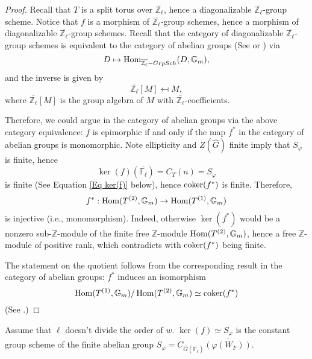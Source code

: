 \begin{proof}
	Recall that $T$ is a split torus over $\overline{\mathbb{Z}_{\ell}}$, hence a diagonalizable $\overline{\mathbb{Z}_{\ell}}$-group scheme. Notice that $f$ is a morphism of $\overline{\mathbb{Z}_{\ell}}$-group schemes, hence a morphism of diagonalizable $\overline{\mathbb{Z}_{\ell}}$-group schemes. Recall that the category of diagonalizable $\overline{\mathbb{Z}_{\ell}}$-group schemes is equivalent to the category of abelian groups (See \cite[p70, Section 5]{brochard2014autour} or \cite{conrad2014reductive}) via
	$$D \mapsto \operatorname{\operatorname{Hom}}_{\overline{\mathbb{Z}_{\ell}}-GrpSch}(D, \mathbb{G}_m),$$
	and the inverse is given by 
	$$\overline{\mathbb{Z}_{\ell}}[M] \mapsfrom M,$$
	where $\overline{\mathbb{Z}_{\ell}}[M]$ is the group algebra of $M$ with $\overline{\mathbb{Z}_{\ell}}$-coefficients.
	
	Therefore, we could argue in the category of abelian groups via the above category equivalence: $f$ is epimorphic if and only if the map $f^*$ in the category of abelian groups is monomorphic. Note ellipticity and $Z(\hat{G})$ finite imply that $S_{\varphi}$ is finite, hence 
	$$\ker(f)(\overline{\mathbb{F}_{\ell}})=C_T(n)=S_{\varphi}$$
	is finite (See Equation \eqref{Eq ker(f)} below), hence $\operatorname{coker}(f^*)$ is finite. Therefore, 
	$$f^*:\operatorname{\operatorname{Hom}}(T^{(2)}, \mathbb{G}_m) \to \operatorname{\operatorname{Hom}}(T^{(1)}, \mathbb{G}_m)$$
	is injective (i.e., monomorphism). Indeed, otherwise $\ker(f^*)$ would be a nonzero sub-$\mathbb{Z}$-module of the finite free $\mathbb{Z}$-module $\operatorname{\operatorname{Hom}}(T^{(2)}, \mathbb{G}_m)$, hence a free $\mathbb{Z}$-module of positive rank, which contradicts with $\operatorname{coker}(f^*)$ being finite.
	
	The statement on the quotient follows from the corresponding result in the category of abelian groups: $f^*$ induces an isomorphism
	$$\operatorname{\operatorname{Hom}}(T^{(1)}, \mathbb{G}_m)/\operatorname{\operatorname{Hom}}(T^{(2)}, \mathbb{G}_m) \simeq \operatorname{coker}(f^*)$$
	(See \cite[p71, Subsection 5.3]{brochard2014autour}.)
\end{proof}

\begin{lemma}\label{Lem ker(f)}
	Assume that $\ell$ doesn't divide the order of $w$. $\ker(f) \simeq \underline{S_{\varphi}}$ is the constant group scheme of the finite abelian group $S_{\varphi}=C_{\hat{G}(\overline{\mathbb{F}_{\ell}})}(\varphi(W_F))$.
\end{lemma}

